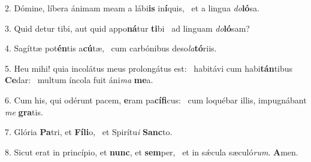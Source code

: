2. Dómine, líbera ánimam meam a lábi\textbf{is} in\textbf{í}quis, \ast\  et a lingua \textit{do}\textbf{ló}sa.\

3. Quid detur tibi, aut quid appo\textbf{ná}tur \textbf{ti}bi \ast\  ad linguam \textit{do}\textbf{ló}sam?\

4. Sagíttæ pot\textbf{én}tis a\textbf{cú}tæ, \ast\  cum carbónibus deso\textit{la}\textbf{tó}riis.\

5. Heu mihi! quia incolátus meus prolongátus est: \dag\  habitávi cum habi\textbf{tán}tibus \textbf{Ce}dar: \ast\  multum íncola fuit áni\textit{ma} \textbf{me}a.\

6. Cum his, qui odérunt pacem, \textbf{e}ram pa\textbf{cí}\textbf{fi}cus: \ast\  cum loquébar illis, impugnábant \textit{me} \textbf{gra}tis.\

7. Glória \textbf{Pa}tri, et \textbf{Fí}\textbf{li}o, \ast\  et Spirítu\textit{i} \textbf{Sanc}to.\

8. Sicut erat in princípio, et \textbf{nunc}, et \textbf{sem}per, \ast\  et in sǽcula sæculó\textit{rum}. \textbf{A}men.\

